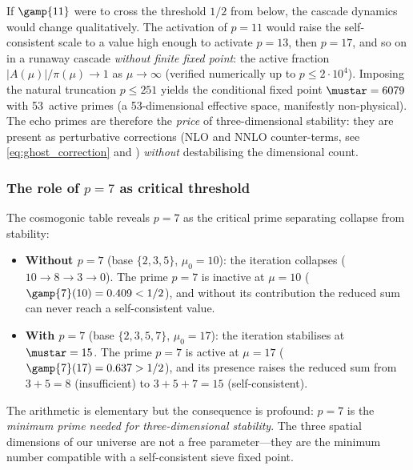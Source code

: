 \documentclass[12pt,a4paper]{article}
\begin{document}
\begin{remark}
\label{rem:firewall}
If $\gamp{11}$ were to cross the threshold $1/2$ from below, the
cascade dynamics would change qualitatively.  The activation of
$p = 11$ would raise the self-consistent scale to a value high enough
to activate $p = 13$, then $p = 17$, and so on in a runaway cascade
\emph{without finite fixed point}: the active fraction
$|A(\mu)|/\pi(\mu) \to 1$ as $\mu \to \infty$ (verified numerically
up to $p \leq 2 \cdot 10^4$).  Imposing the natural truncation
$p \leq 251$ yields the conditional fixed point $\mustar = 6079$
with 53~active primes (a 53-dimensional effective space, manifestly
non-physical).  The echo primes are therefore the \emph{price} of
three-dimensional stability: they are present as perturbative
corrections (NLO and NNLO counter-terms, see
\eqref{eq:ghost_correction} and \cite{companion_physics})
\emph{without} destabilising the dimensional count.
\end{remark}

\subsubsection{The role of $p = 7$ as critical threshold}
\label{sec:ch8_p7_threshold}

The cosmogonic table reveals $p = 7$ as the critical prime separating
collapse from stability:

\begin{itemize}[nosep]
\item \textbf{Without $p = 7$} (base $\{2,3,5\}$, $\mu_0 = 10$): the
  iteration collapses ($10 \to 8 \to 3 \to 0$).  The prime $p = 7$ is
  inactive at $\mu = 10$ ($\gamp{7}(10) = 0.409 < 1/2$), and without
  its contribution the reduced sum can never reach a self-consistent
  value.
\item \textbf{With $p = 7$} (base $\{2,3,5,7\}$, $\mu_0 = 17$): the
  iteration stabilises at $\mustar = 15$.  The prime $p = 7$ is active
  at $\mu = 17$ ($\gamp{7}(17) = 0.637 > 1/2$), and its presence
  raises the reduced sum from $3 + 5 = 8$ (insufficient) to
  $3 + 5 + 7 = 15$ (self-consistent).
\end{itemize}

The arithmetic is elementary but the consequence is
profound: $p = 7$ is the \emph{minimum prime needed for
three-dimensional stability}.  The three spatial dimensions of our
universe are not a free parameter---they are the minimum number
compatible with a self-consistent sieve fixed point.
\end{document}
